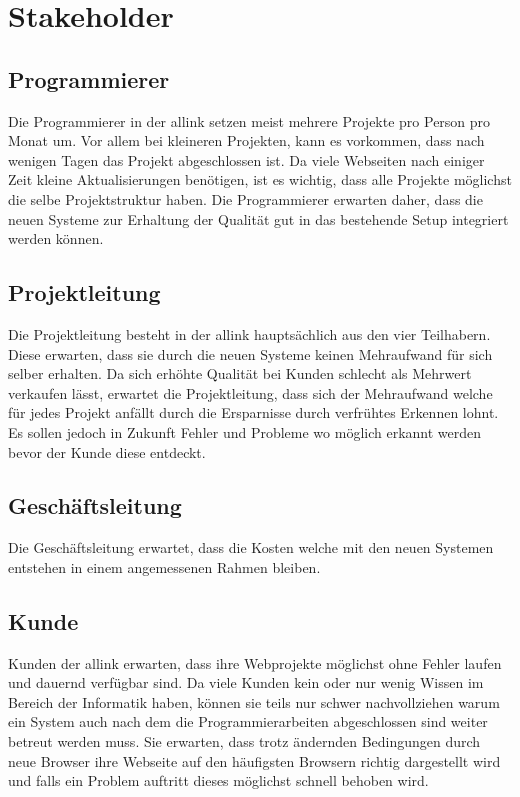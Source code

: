 \section{Stakeholder}
\label{sec:stakeholder}


\subsection{Programmierer}
\label{sub:programmierer}
Die Programmierer in der allink setzen meist mehrere Projekte pro Person pro Monat um. Vor allem bei kleineren Projekten, kann es vorkommen, dass nach wenigen Tagen das Projekt abgeschlossen ist. Da viele Webseiten nach einiger Zeit kleine Aktualisierungen benötigen, ist es wichtig, dass alle Projekte möglichst die selbe Projektstruktur haben. Die Programmierer erwarten daher, dass die neuen Systeme zur Erhaltung der Qualität gut in das bestehende Setup integriert werden können.

\subsection{Projektleitung}
\label{sub:projektleitung}
Die Projektleitung besteht in der allink hauptsächlich aus den vier Teilhabern. Diese erwarten, dass sie durch die neuen Systeme keinen Mehraufwand für sich selber erhalten. Da sich erhöhte Qualität bei Kunden schlecht als Mehrwert verkaufen lässt, erwartet die Projektleitung, dass sich der Mehraufwand welche für jedes Projekt anfällt durch die Ersparnisse durch verfrühtes Erkennen lohnt. Es sollen jedoch in Zukunft Fehler und Probleme wo möglich erkannt werden bevor der Kunde diese entdeckt.

\subsection{Geschäftsleitung}
\label{sub:geschäftsleitung}
Die Geschäftsleitung erwartet, dass die Kosten welche mit den neuen Systemen entstehen in einem angemessenen Rahmen bleiben.

\subsection{Kunde}
\label{sub:kunde}
Kunden der allink erwarten, dass ihre Webprojekte möglichst ohne Fehler laufen und dauernd verfügbar sind. Da viele Kunden kein oder nur wenig Wissen im Bereich der Informatik haben, können sie teils nur schwer nachvollziehen warum ein System auch nach dem die Programmierarbeiten abgeschlossen sind weiter betreut werden muss. Sie erwarten, dass trotz ändernden Bedingungen durch neue Browser ihre Webseite auf den häufigsten Browsern richtig dargestellt wird und falls ein Problem auftritt dieses möglichst schnell behoben wird.


